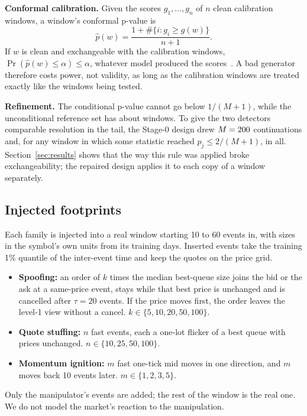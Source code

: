 \documentclass[journal]{IEEEtran}
\begin{document}
\textbf{Conformal calibration.} Given the scores $g_1,\dots,g_n$ of $n$ clean calibration windows, a window's
conformal p-value is
\begin{equation}
\hat p(w)=\frac{1+\#\{i: g_i\ge g(w)\}}{n+1}.
\end{equation}
If $w$ is clean and exchangeable with the calibration windows, $\Pr(\hat p(w)\le\alpha)\le\alpha$, whatever
model produced the scores~\cite{vovk2005algorithmic,bates2023testing}. A bad generator therefore costs power, not
validity, as long as the calibration windows are treated exactly like the windows being tested.

\textbf{Refinement.} The conditional p-value cannot go below $1/(M+1)$, while the unconditional reference set has
about \nRef{} windows. To give the two detectors comparable resolution in the tail, the Stage-0 design drew
$M=200$ continuations and, for any window in which some statistic reached $p_j\le 2/(M+1)$, \Mrefine{} in all.
Section~\ref{sec:results} shows that the way this rule was applied broke exchangeability; the repaired design
applies it to each copy of a window separately.

\subsection{Injected footprints}
Each family is injected into a real window starting 10 to 60 events in, with sizes in the symbol's own units
from its training days. Inserted events take the training 1\% quantile of the inter-event time and keep the
quotes on the price grid.
\begin{itemize}
\item \textbf{Spoofing:} an order of $k$ times the median best-queue size joins the bid or the ask at a
same-price event, stays while that best price is unchanged and is cancelled after $\tau=20$ events. If the price
moves first, the order leaves the level-1 view without a cancel. $k\in\{5,10,20,50,100\}$.
\item \textbf{Quote stuffing:} $n$ fast events, each a one-lot flicker of a best queue with prices unchanged.
$n\in\{10,25,50,100\}$.
\item \textbf{Momentum ignition:} $m$ fast one-tick mid moves in one direction, and $m$ moves back 10 events
later. $m\in\{1,2,3,5\}$.
\end{itemize}
Only the manipulator's events are added; the rest of the window is the real one. We do not model the market's
reaction to the manipulation.
\end{document}
